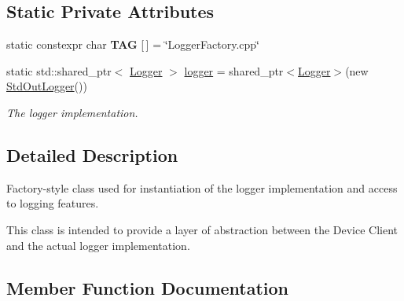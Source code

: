 \subsection*{Static Private Attributes}
\begin{DoxyCompactItemize}
\item 
\mbox{\label{class_aws_1_1_iot_1_1_device_client_1_1_logging_1_1_logger_factory_ab1a8c22c64747cdc96dd69d889557f49}} 
static constexpr char {\bfseries T\+AG} \mbox{[}$\,$\mbox{]} = \char`\"{}Logger\+Factory.\+cpp\char`\"{}
\item 
\mbox{\label{class_aws_1_1_iot_1_1_device_client_1_1_logging_1_1_logger_factory_a2e578976f1980624ab0c79c42bb3af5f}} 
static std\+::shared\+\_\+ptr$<$ \hyperlink{class_aws_1_1_iot_1_1_device_client_1_1_logging_1_1_logger}{Logger} $>$ \hyperlink{class_aws_1_1_iot_1_1_device_client_1_1_logging_1_1_logger_factory_a2e578976f1980624ab0c79c42bb3af5f}{logger} = shared\+\_\+ptr$<$\hyperlink{class_aws_1_1_iot_1_1_device_client_1_1_logging_1_1_logger}{Logger}$>$(new \hyperlink{class_aws_1_1_iot_1_1_device_client_1_1_logging_1_1_std_out_logger}{Std\+Out\+Logger}())
\begin{DoxyCompactList}\small\item\em The logger implementation. \end{DoxyCompactList}\end{DoxyCompactItemize}


\subsection{Detailed Description}
Factory-\/style class used for instantiation of the logger implementation and access to logging features. 

This class is intended to provide a layer of abstraction between the Device Client and the actual logger implementation. 

\subsection{Member Function Documentation}
\mbox{\label{class_aws_1_1_iot_1_1_device_client_1_1_logging_1_1_logger_factory_aa3aeb2ab09afe3977d3a4b273a1406ae}} 
